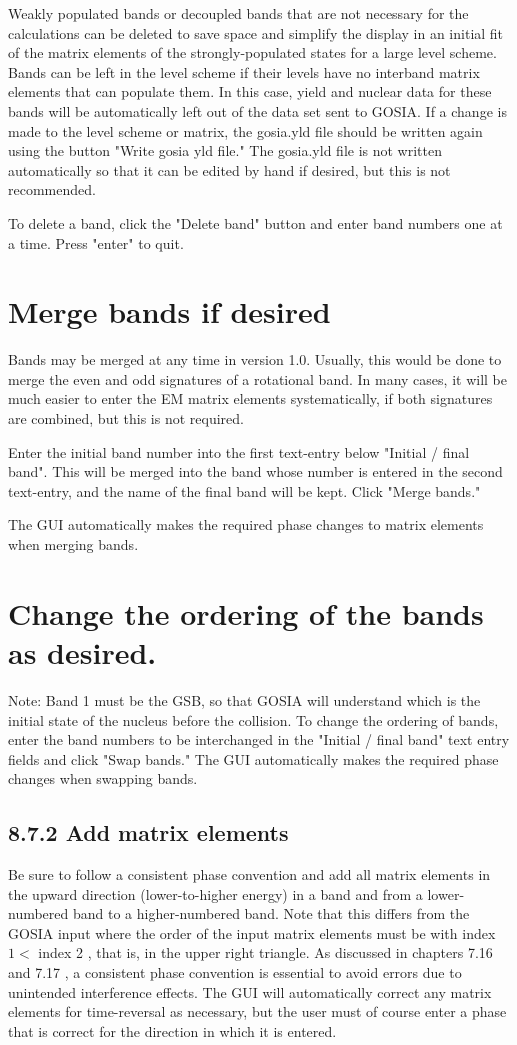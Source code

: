 \documentclass[10pt]{article}
\begin{document}
Weakly populated bands or decoupled bands that are not necessary for the calculations can be deleted to save space and simplify the display in an initial fit of the matrix elements of the strongly-populated states for a large level scheme. Bands can be left in the level scheme if their levels have no interband matrix elements that can populate them. In this case, yield and nuclear data for these bands will be automatically left out of the data set sent to GOSIA. If a change is made to the level scheme or matrix, the gosia.yld file should be written again using the button "Write gosia yld file." The gosia.yld file is not written automatically so that it can be edited by hand if desired, but this is not recommended.

To delete a band, click the "Delete band" button and enter band numbers one at a time. Press "enter" to quit.

\section*{Merge bands if desired}
Bands may be merged at any time in version 1.0. Usually, this would be done to merge the even and odd signatures of a rotational band. In many cases, it will be much easier to enter the EM matrix elements systematically, if both signatures are combined, but this is not required.

Enter the initial band number into the first text-entry below "Initial / final band". This will be merged into the band whose number is entered in the second text-entry, and the name of the final band will be kept. Click "Merge bands."

The GUI automatically makes the required phase changes to matrix elements when merging bands.

\section*{Change the ordering of the bands as desired.}
Note: Band 1 must be the GSB, so that GOSIA will understand which is the initial state of the nucleus before the collision. To change the ordering of bands, enter the band numbers to be interchanged in the "Initial / final band" text entry fields and click "Swap bands." The GUI automatically makes the required phase changes when swapping bands.

\subsection*{8.7.2 Add matrix elements}
Be sure to follow a consistent phase convention and add all matrix elements in the upward direction (lower-to-higher energy) in a band and from a lower-numbered band to a higher-numbered band. Note that this differs from the GOSIA input where the order of the input matrix elements must be with index $1<$ index 2 , that is, in the upper right triangle. As discussed in chapters 7.16 and 7.17 , a consistent phase convention is essential to avoid errors due to unintended interference effects. The GUI will automatically correct any matrix elements for time-reversal as necessary, but the user must of course enter a phase that is correct for the direction in which it is entered.
\end{document}
